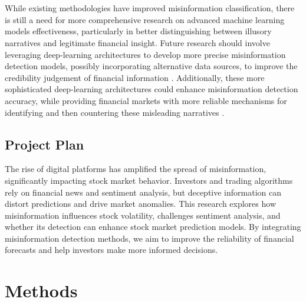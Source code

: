 \documentclass{article}
\begin{document}
\\\\
While existing methodologies have improved misinformation classification, there is still a need for more comprehensive research on advanced machine learning models effectiveness, particularly in better distinguishing between illusory narratives and legitimate financial insight. Future research should involve leveraging deep-learning architectures to develop more precise misinformation detection models, possibly incorporating alternative data sources, to improve the credibility judgement of financial information \cite{source30}. Additionally, these more sophisticated deep-learning architectures could enhance misinformation detection accuracy, while providing financial markets with more reliable mechanisms for identifying and then countering these misleading narratives \cite{source30}.


\subsection{Project Plan}

The rise of digital platforms has amplified the spread of misinformation, significantly impacting stock market behavior. Investors and trading algorithms rely on financial news and sentiment analysis, but deceptive information can distort predictions and drive market anomalies. This research explores how misinformation influences stock volatility, challenges sentiment analysis, and whether its detection can enhance stock market prediction models. By integrating misinformation detection methods, we aim to improve the reliability of financial forecasts and help investors make more informed decisions.


\section{Methods}
\end{document}
